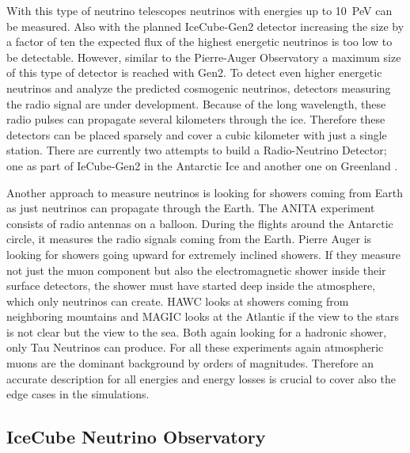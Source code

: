 With this type of neutrino telescopes neutrinos with energies up to \SI{10}{PeV} can be measured.
Also with the planned IceCube-Gen2 detector increasing the size by a factor of ten \cite{IceCube20Gen2} the expected flux of the highest energetic neutrinos is too low to be detectable.
However, similar to the Pierre-Auger Observatory a maximum size of this type of detector is reached with Gen2.
To detect even higher energetic neutrinos and analyze the predicted cosmogenic neutrinos, detectors measuring the radio signal are under development.
Because of the long wavelength, these radio pulses can propagate several kilometers through the ice.
Therefore these detectors can be placed sparsely and cover a cubic kilometer with just a single station.
There are currently two attempts to build a Radio-Neutrino Detector; one as part of IeCube-Gen2 in the Antarctic Ice and another one on Greenland \cite{RNOG20}.

Another approach to measure neutrinos is looking for showers coming from Earth as just neutrinos can propagate through the Earth.
The ANITA experiment consists of radio antennas on a balloon.
During the flights around the Antarctic circle, it measures the radio signals coming from the Earth.
Pierre Auger is looking for showers going upward for extremely inclined showers.
If they measure not just the muon component but also the electromagnetic shower inside their surface detectors, the shower must have started deep inside the atmosphere, which only neutrinos can create.
HAWC looks at showers coming from neighboring mountains and MAGIC looks at the Atlantic if the view to the stars is not clear but the view to the sea.
Both again looking for a hadronic shower, only Tau Neutrinos can produce.
For all these experiments again atmospheric muons are the dominant background by orders of magnitudes.
Therefore an accurate description for all energies and energy losses is crucial to cover also the edge cases in the simulations.

\subsection{IceCube Neutrino Observatory} \label{sec:IceCube}


